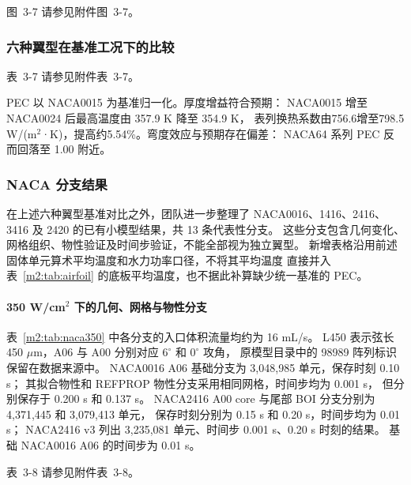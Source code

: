 \documentclass[UTF8]{midterm}
\makeatletter
\newcommand{\submissionnumber}[1]{\def\@currentlabel{#1}}
\makeatother
\begin{document}
\par\noindent \begingroup\submissionnumber{3-7}\label{m2:fig:other-small}\endgroup 图~3-7 请参见附件图~3-7。\par



\subsubsection{六种翼型在基准工况下的比较}


\par\noindent \begingroup\submissionnumber{3-7}\label{m2:tab:airfoil}\endgroup 表~3-7 请参见附件表~3-7。\par


PEC 以 NACA0015 为基准归一化。厚度增益符合预期：
NACA0015 增至 NACA0024 后最高温度由 357.9 K 降至 354.9 K，
表列换热系数由756.6增至798.5 W/(m$^2$·K)，提高约5.54\%。弯度效应与预期存在偏差：
NACA64 系列 PEC 反而回落至 1.00 附近。


\subsubsection{NACA 分支结果}
在上述六种翼型基准对比之外，团队进一步整理了 NACA0016、1416、2416、3416
及 2420 的已有小模型结果，共 13 条代表性分支。
这些分支包含几何变化、网格组织、物性验证及时间步验证，不能全部视为独立翼型。
新增表格沿用前述固体单元算术平均温度和水力功率口径，不将其平均温度
直接并入表~\ref{m2:tab:airfoil} 的底板平均温度，也不据此补算缺少统一基准的 PEC。

\paragraph{350 W/cm$^2$ 下的几何、网格与物性分支}
表~\ref{m2:tab:naca350} 中各分支的入口体积流量均约为 16 mL/s。
L450 表示弦长 450 $\mu$m，A06 与 A00 分别对应 $6^\circ$ 和 $0^\circ$ 攻角，
原模型目录中的 98989 阵列标识保留在数据来源中。
NACA0016 A06 基础分支为 3,048,985 单元，保存时刻 0.10 s；
其拟合物性和 REFPROP 物性分支采用相同网格，时间步均为 0.001 s，
但分别保存于 0.200 s 和 0.137 s。
NACA2416 A00 core 与尾部 BOI 分支分别为 4,371,445 和 3,079,413 单元，
保存时刻分别为 0.15 s 和 0.20 s，时间步均为 0.01 s；
NACA2416 v3 列出 3,235,081 单元、时间步 0.001 s、0.20 s 时刻的结果。
基础 NACA0016 A06 的时间步为 0.01 s。

\par\noindent \begingroup\submissionnumber{3-8}\label{m2:tab:naca350}\endgroup 表~3-8 请参见附件表~3-8。\par
\end{document}
